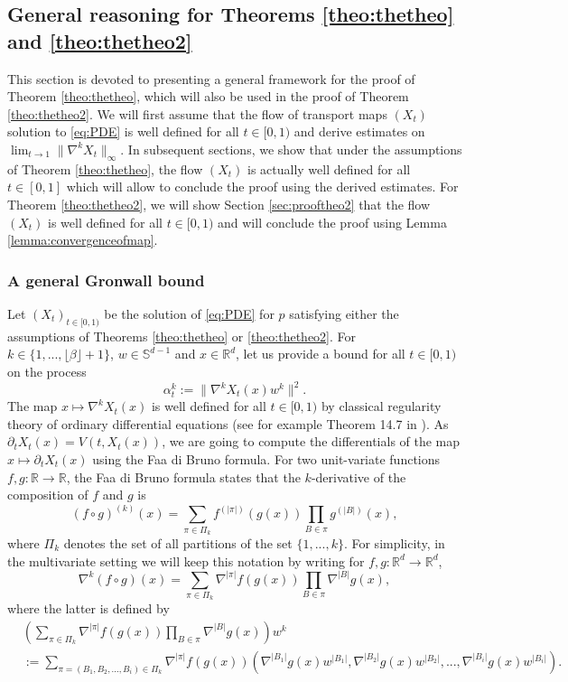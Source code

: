 \documentclass{article}
\begin{document}
\subsection{General reasoning for Theorems \ref{theo:thetheo} and \ref{theo:thetheo2}}\label{sec:generalreas} 
This section is devoted to presenting a general framework for the proof of Theorem \ref{theo:thetheo}, which will also be used in the proof of Theorem \ref{theo:thetheo2}.  We will first assume that the flow of transport maps $(X_t)$ solution to \eqref{eq:PDE} is well defined for all $t\in [0,1)$ and derive estimates on $\lim_{t\rightarrow 1}\|\nabla^k X_t\|_\infty$. In subsequent sections, we  show that under the assumptions of Theorem \ref{theo:thetheo}, the flow $(X_t)$ is actually well defined for all $t\in [0,1]$ which will allow to conclude the proof using the derived estimates. For Theorem \ref{theo:thetheo2}, we will show Section \ref{sec:prooftheo2} that the flow $(X_t)$ is well defined for all $t\in [0,1)$ and will conclude the proof using Lemma \ref{lemma:convergenceofmap}.
\subsubsection{A general Gronwall bound}\label{sec:gronwall}
Let $(X_t)_{t\in [0,1)}$ be the solution of \eqref{eq:PDE} for $p$ satisfying either the assumptions of Theorems \ref{theo:thetheo} or \ref{theo:thetheo2}. For $k\in \{1,...,\lfloor \beta \rfloor +1\}$, $w\in \mathbb{S}^{d-1}$ and $x\in \mathbb{R}^d$, let us provide a bound for all $t\in [0,1)$ on the process 
$$
\alpha_t^k:=\|\nabla^k X_t(x)w^k\|^2.
$$ 
The map $x\mapsto \nabla^k X_t(x)$ is well defined for all $t\in [0,1)$ by classical regularity theory of ordinary differential equations (see for example Theorem 14.7 in \cite{tu2011manifolds}).
As 
$\partial_t X_t(x)=V(t,X_t(x))$,
we are going to compute the differentials of the map $x\mapsto \partial_t X_t(x)$ using the Faa di Bruno formula. For two unit-variate functions $f,g:\mathbb{R}\rightarrow \mathbb{R}$, the Faa di Bruno formula states that the $k$-derivative of the composition of $f$ and $g$ is
\begin{equation*}
    (f\circ g)^{(k)}(x) =\sum_{\pi \in \Pi_k} f^{(|\pi|)} (g(x)) \prod_{B\in \pi} g^{(|B|)} (x),
\end{equation*}
where $\Pi_k$ denotes the set of all partitions of the set $\{1,...,k\}$. For simplicity, in the multivariate setting we will keep this notation by writing for $f,g:\mathbb{R}^d\rightarrow \mathbb{R}^d$,
$$\nabla^k (f\circ g)(x)=\sum_{\pi \in \Pi_k} \nabla^{|\pi|}f(g(x)) \prod_{B\in \pi} \nabla^{|B|} g(x),$$
where the latter is defined by
\begin{align*}
&\left(\sum_{\pi \in \Pi_k} \nabla^{|\pi|}f(g(x)) \prod_{B\in \pi} \nabla^{|B|} g(x)\right)w^k\\
& := \sum_{\pi=(B_1,B_2,...,B_i) \in \Pi_k} \nabla^{|\pi|}f(g(x)) \left( \nabla^{|B_1|} g(x)w^{|B_1|},\nabla^{|B_2|}g(x)w^{|B_2|},...,\nabla^{|B_i|} g(x)w^{|B_i|}\right).
\end{align*}
\end{document}
